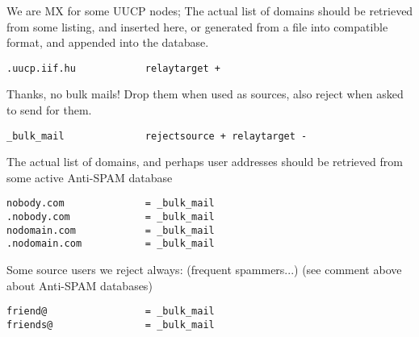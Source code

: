 We are MX for some UUCP nodes;  The actual list of domains should
be retrieved from some listing, and inserted here, or generated from
a file into compatible format, and appended into the database.

\begin{tscreen}
\begin{verbatim}
.uucp.iif.hu            relaytarget +
\end{verbatim}
\end{tscreen}


Thanks, no bulk mails! Drop them when used as sources, also reject
when asked to send for them.

\begin{tscreen}
\begin{verbatim}
_bulk_mail              rejectsource + relaytarget -
\end{verbatim}
\end{tscreen}


The actual list of domains, and perhaps user addresses should
be retrieved from some active Anti-SPAM database

\begin{tscreen}
\begin{verbatim}
nobody.com              = _bulk_mail
.nobody.com             = _bulk_mail
nodomain.com            = _bulk_mail
.nodomain.com           = _bulk_mail
\end{verbatim}
\end{tscreen}


Some source users we reject always: (frequent spammers...)
(see comment above about Anti-SPAM databases)

\begin{tscreen}
\begin{verbatim}
friend@                 = _bulk_mail
friends@                = _bulk_mail
\end{verbatim}
\end{tscreen}
